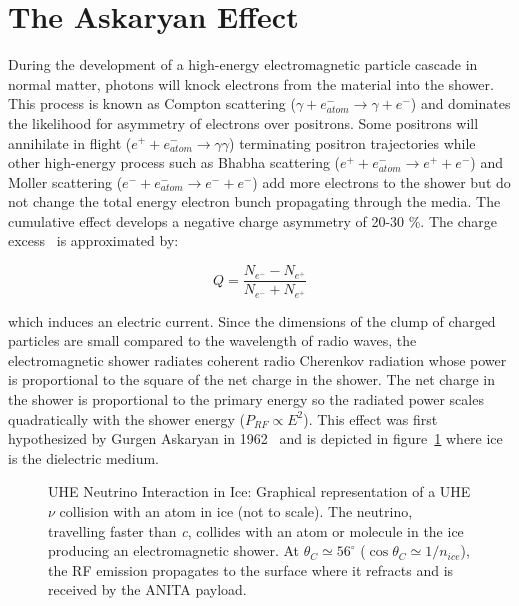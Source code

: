 \section{The Askaryan Effect}
\label{s:askaryan}

\par During the development of a high-energy electromagnetic particle cascade in normal matter, photons will knock electrons from the material into the shower.  This process is known as Compton scattering ($\gamma + e_{atom}^{-} \rightarrow \gamma + e^{-}$) and dominates the likelihood for asymmetry of electrons over positrons.  Some positrons will annihilate in flight ($e^{+} + e_{atom}^{-} \rightarrow \gamma\gamma$) terminating positron trajectories while other high-energy process such as Bhabha scattering ($e^{+} + e_{atom}^{-} \rightarrow e^{+} + e^{-}$) and Moller scattering ($e^{-} + e_{atom}^{-} \rightarrow e^{-} + e^{-}$) add more electrons to the shower but do not change the total energy electron bunch propagating through the media.  The cumulative effect develops a negative charge asymmetry of 20-30 \%.  The charge excess~\cite{Zas.1992} is approximated by:

\begin{equation}
\label{eq:chargeEx}
Q = \frac{N_{e^{-}} - N_{e^{+}}}{N_{e^{-}} + N_{e^{+}}}
\end{equation}

\noindent which induces an electric current.  Since the dimensions of the clump of charged particles are small compared to the wavelength of radio waves, the electromagnetic shower radiates coherent radio Cherenkov radiation whose power is proportional to the square of the net charge in the shower.  The net charge in the shower is proportional to the primary energy so the radiated power scales quadratically with the shower energy ($P_{RF}\propto E^{2}$).  This effect was first hypothesized by Gurgen Askaryan in 1962~\cite{Askaryan.1962,Askaryan.1965} and is depicted in figure~\ref{fig:nuInteractionInIce} where ice is the dielectric medium.

\begin{figure}[htbp]
\centering
\epsfxsize=4.0in
\caption{UHE Neutrino Interaction in Ice:  Graphical representation of a UHE $\nu$ collision with an atom in ice (not to scale).  The neutrino, travelling faster than \emph{c}, collides with an atom or molecule in the ice producing an electromagnetic shower.  At $\theta_{C} \simeq 56^{\circ}$ ($\cos\theta_{C} \simeq 1/n_{ice}$), the RF emission propagates to the surface where it refracts and is received by the ANITA payload.}
\label{fig:nuInteractionInIce}
\end{figure}

